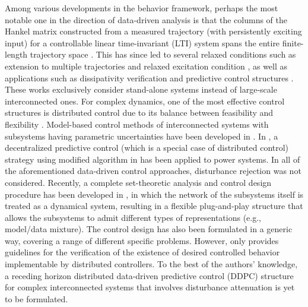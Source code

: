 \documentclass[11pt,print,draftcls,onecolumn,romanappendices]{ieeecolor}
\newcommand{\revise}[1]{{\color{black} #1}}
\begin{document}
Among various developments in the behavior framework, perhaps the most notable one in the direction of data-driven analysis is that the columns of the Hankel matrix constructed from a measured trajectory (with persistently exciting input) for a controllable linear time-invariant (LTI) system spans the entire finite-length trajectory space \cite{Willems:2005}. This has since led to several relaxed conditions such as extension to multiple trajectories \cite{vanWaarde:2020} and relaxed excitation condition \cite{Markovsky:2020}, as well as applications such as dissipativity verification \cite{Yan:2019a,Romer:2019} and predictive control structures \cite{Coulson:2019,Wei:2020,Berberich:2020a,Coulson:2021}. These works exclusively consider stand-alone systems instead of large-scale interconnected ones. For complex dynamics, one of the most effective control structures is distributed control due to its balance between feasibility and flexibility \cite{Tippett:2013,Tippett:2014}. Model-based control methods of interconnected systems with subsystems having parametric uncertainties have been developed in \cite{Yan:2019}. In \cite{Huang:2021}, a decentralized predictive control (which is a special case of distributed control) strategy using modified algorithm in \cite{Coulson:2019} has been applied to power systems. In all of the aforementioned data-driven control approaches, \revise{disturbance rejection was not considered}. Recently, a complete set-theoretic analysis and control design procedure has been developed in \cite{Yan:2021}, in which the network of the subsystems itself is treated as a dynamical system, resulting in a flexible plug-and-play structure that allows the subsystems to admit different types of representations (e.g., model/data mixture). The control design has also been formulated in a generic way, covering a range of different specific problems. However, \cite{Yan:2021} only provides \revise{guidelines for} the verification of the existence of desired controlled behavior implementable by distributed controllers. To the best of the authors' knowledge, a receding horizon distributed data-driven predictive control (DDPC) structure for complex interconnected systems that involves disturbance attenuation is yet to be formulated.
\end{document}
